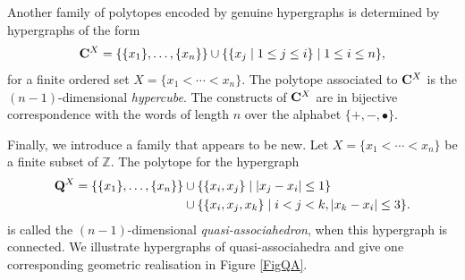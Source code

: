 \documentclass{article}
\theoremstyle{plain}
\theoremstyle{definition}
\newcommand{\set}[1]{\{#1\}}
\newcommand{\setc}[2]{\set{#1 \mid #2}}
\newcommand{\hyper}[1]{{\bf #1}}
\begin{document}
\smallskip
Another family of polytopes encoded by genuine hypergraphs is determined by hypergraphs of the form 
 $$\hyper{C}^X=\{\{x_1\},\dots,\{x_n\}\}\cup\setc{\setc{x_j}{1\leq j\leq i}}{1\leq i\leq n},$$ for a finite ordered set $X=\set{x_1<\cdots<x_n}$. The polytope associated to $\hyper{C}^X$ is the $(n-1)$-dimensional {\em hypercube}. The constructs of $\hyper{C}^X$ are in bijective correspondence with the words of
length $n$ over the alphabet $\{+,-,\bullet\}$.

\smallskip
Finally, we introduce a family that appears to be new. Let $X=\set{x_1<\cdots<x_n}$ be a finite subset of $\mathbb{Z}$. The polytope for the hypergraph
\begin{align*}
\hyper{Q}^X=\{\{x_1\},\dots,\{x_n\}\} & \cup\setc{\{x_i,x_j\}}{|x_j-x_i|\leq 1} \\ &\cup\setc{\{x_i,x_j,x_k\}}{i<j<k, |x_k-x_i|\leq 3}.
\end{align*} 
is called the $(n-1)$-dimensional {\em quasi-associahedron}, when this hypergraph is connected.
 We illustrate hypergraphs of quasi-associahedra and give one corresponding geometric realisation in Figure \ref{FigQA}.
\end{document}

